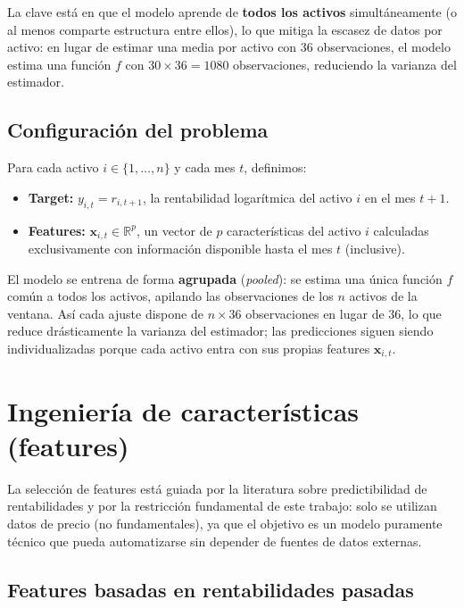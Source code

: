 La clave está en que el modelo aprende de \textbf{todos los activos}
simultáneamente (o al menos comparte estructura entre ellos), lo que mitiga
la escasez de datos por activo: en lugar de estimar una media
por activo con 36 observaciones, el modelo estima una función $f$ con
$30 \times 36 = 1080$ observaciones, reduciendo la varianza del estimador.

\subsection{Configuración del problema}
\label{subsec:config-ml}

Para cada activo $i \in \{1, \dots, n\}$ y cada mes $t$, definimos:

\begin{itemize}
    \item \textbf{Target:} $y_{i,t} = r_{i,t+1}$, la rentabilidad logarítmica
          del activo $i$ en el mes $t+1$.
    \item \textbf{Features:} $\mathbf{x}_{i,t} \in \mathbb{R}^p$, un vector
          de $p$ características del activo $i$ calculadas exclusivamente con
          información disponible hasta el mes $t$ (inclusive).
\end{itemize}

El modelo se entrena de forma \textbf{agrupada} (\textit{pooled}): se estima una
única función $f$ común a todos los activos, apilando las observaciones de los
$n$ activos de la ventana. Así cada ajuste dispone de $n \times 36$
observaciones en lugar de 36, lo que reduce drásticamente la varianza del
estimador; las predicciones siguen siendo individualizadas porque cada activo
entra con sus propias features $\mathbf{x}_{i,t}$.

\section{Ingeniería de características (features)}

La selección de features está guiada por la literatura sobre predictibilidad
de rentabilidades \cite{Gu2020} y por la restricción fundamental de este
trabajo: solo se utilizan datos de precio (no fundamentales), ya que el
objetivo es un modelo puramente técnico que pueda automatizarse sin depender
de fuentes de datos externas.

\subsection{Features basadas en rentabilidades pasadas}

